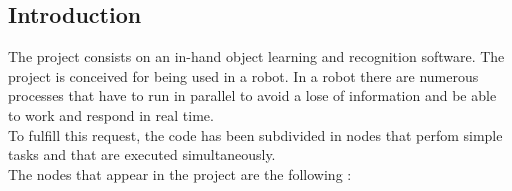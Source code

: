 

%
%



\subsection{Introduction}
\hspace{0.5cm}The project consists on an in-hand object learning and recognition software. 
The project is conceived for being used in a robot. In a robot there are numerous processes that have to run in parallel to avoid a lose of information and be able to work and respond in real time. 
\\
To fulfill this request, the code has been subdivided in nodes that perfom simple tasks and that are executed simultaneously. 
\\
The nodes that appear in the project are the following : 

